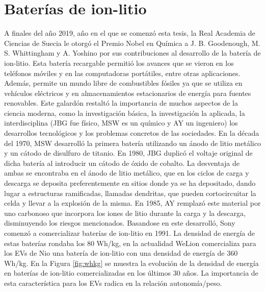 \section{Baterías de ion-litio}

A finales del año 2019, año en el que se comenzó esta tesis, la Real Academia 
de Ciencias de Suecia le otorgó el Premio Nobel en Química a J. B. Goodenough, 
M. S. Whittingham y A. Yoshino por sus contribuciones al desarrollo de la batería 
de ion-litio. Esta batería recargable permitió los avances que se vieron en los 
teléfonos móviles y en las computadoras portátiles, entre otras aplicaciones.
Además, permite un mundo libre de combustibles fósiles ya que se utiliza en 
vehículos eléctricos y en almacenamientos estacionarios de energía para fuentes
renovables. Este galardón restaltó la importancia de muchos aspectos de la ciencia
moderna, como la investigación básica, la investigación la aplicada, la 
interdisciplina (JBG fue físico, MSW es un químico y AY un ingeniero) los 
desarrollos tecnológicos y los problemas concretos de las sociedades.
En la década del 1970, MSW desarrolló la primera batería utilizando un ánodo de
litio metálico y un cátodo de disulfuro de titanio. En 1980, JBG duplicó el 
voltaje original de dicha batería al introducir un cátodo de óxido de cobalto.
La desventaja de ambas se encontraba en el ánodo de litio metálico, que en los 
ciclos de carga y descarga se deposita preferentemente en sitios donde ya se 
ha depositado, dando lugar a estructuras ramificadas, llamadas dendritas, que 
pueden cortocircuitar la celda y llevar a la explosión de la misma. En 1985,
AY remplazó este material por uno carbonoso que incorpora los iones de litio
durante la carga y la descarga, disminuyendo los riesgos mencionados. Basandose
en este desarrolló, Sony comenzó a comercializar baterías de ion-litio en 1991.
La densidad de energía de estas baterías rondaba los 80 Wh/kg, en la actualidad
WeLion comercializa para los EVs de Nio una batería de ion-litio con una 
densidad de energía de 360 Wh/kg. En la Figura \ref{fig:whkg} se muestra la 
evolución de la densidad de energía en baterías de ion-litio comercializadas 
en los últimos 30 años. La importancia de esta característica para los EVs 
radica en la relación autonomía/peso.

